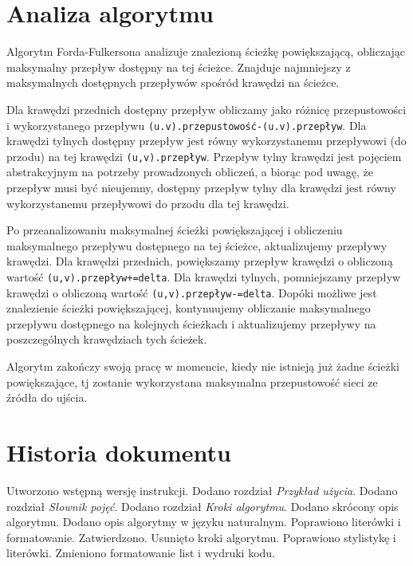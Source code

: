 \documentclass[10pt]{dokument-tiwo}
\begin{document}
\section{Analiza algorytmu}
\label{sec:analiza}

Algorytm Forda-Fulkersona analizuje znalezioną ścieżkę powiększającą, obliczając
maksymalny przepływ dostępny na tej ścieżce. Znajduje najmniejszy z maksymalnych
dostępnych przepływów spośród krawędzi na ścieżce.

Dla krawędzi przednich dostępny przepływ obliczamy jako różnicę przepustowości i
wykorzystanego przepływu \texttt{(u.v).przepustowość-(u.v).przepływ}. Dla
krawędzi tylnych dostępny przepływ jest równy wykorzystanemu przepływowi (do
przodu) na tej krawędzi \texttt{(u,v).przepływ}. Przepływ tylny krawędzi jest
pojęciem abstrakcyjnym na potrzeby prowadzonych obliczeń, a biorąc pod uwagę, że
przepływ musi być nieujemny, dostępny przepływ tylny dla krawędzi jest równy
wykorzystanemu przepływowi do przodu dla tej krawędzi.

Po przeanalizowaniu maksymalnej ścieżki powiększającej i obliczeniu maksymalnego
przepływu dostępnego na tej ścieżce, aktualizujemy przepływy krawędzi. Dla
krawędzi przednich, powiększamy przepływ krawędzi o obliczoną wartość
\texttt{(u,v).przepływ+=delta}. Dla krawędzi tylnych, pomniejszamy przepływ
krawędzi o obliczoną wartość \texttt{(u,v).przepływ-=delta}. Dopóki możliwe jest
znalezienie ścieżki powiększającej, kontynuujemy obliczanie maksymalnego
przepływu dostępnego na kolejnych ścieżkach i aktualizujemy przepływy na
poszczególnych krawędziach tych ścieżek.

Algorytm zakończy swoją pracę w momencie, kiedy nie istnieją już żadne ścieżki
powiększające, tj zostanie wykorzystana maksymalna przepustowość sieci ze źródła
do ujścia.


\newpage
\section*{Historia dokumentu}
\begin{versions}
        Utworzono wstępną wersję instrukcji.
        Dodano rozdział \emph{Przykład użycia}.
        Dodano rozdział \emph{Słownik pojęć}.
        Dodano rozdział \emph{Kroki algorytmu}.
        Dodano skrócony opis algorytmu. Dodano opis algorytmy w języku
        naturalnym.
        Poprawiono literówki i formatowanie.
        Zatwierdzono.
        Usunięto kroki algorytmu.
        Poprawiono stylistykę i literówki.
        Zmieniono formatowanie list i wydruki kodu.
\end{versions}
\end{document}
